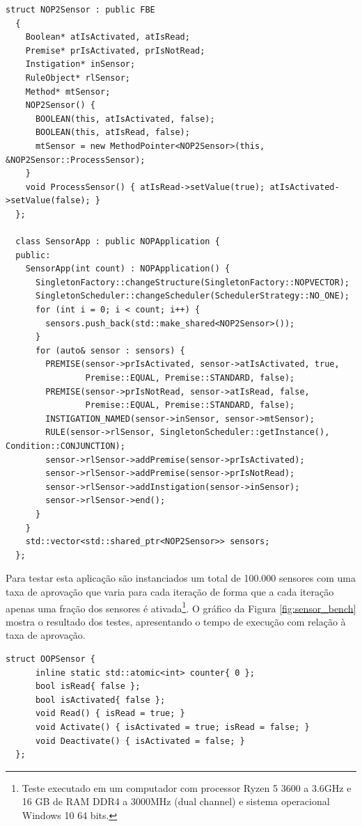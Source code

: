 \begin{lstlisting}[caption = {Código da estrutura do sensor com o \textit{Framework} PON C++ 2.0},
  source = {Autoria própria},
  label = {cod:sensor_fw2}]
  struct NOP2Sensor : public FBE
  {
    Boolean* atIsActivated, atIsRead;
    Premise* prIsActivated, prIsNotRead;
    Instigation* inSensor;
    RuleObject* rlSensor;  
    Method* mtSensor;  
    NOP2Sensor() {
      BOOLEAN(this, atIsActivated, false);
      BOOLEAN(this, atIsRead, false);
      mtSensor = new MethodPointer<NOP2Sensor>(this, &NOP2Sensor::ProcessSensor);
    }
    void ProcessSensor() { atIsRead->setValue(true); atIsActivated->setValue(false); }
  };

  class SensorApp : public NOPApplication {
  public:
    SensorApp(int count) : NOPApplication() {
      SingletonFactory::changeStructure(SingletonFactory::NOPVECTOR);
      SingletonScheduler::changeScheduler(SchedulerStrategy::NO_ONE);
      for (int i = 0; i < count; i++) {
        sensors.push_back(std::make_shared<NOP2Sensor>());
      }
      for (auto& sensor : sensors) {
        PREMISE(sensor->prIsActivated, sensor->atIsActivated, true,
                Premise::EQUAL, Premise::STANDARD, false);
        PREMISE(sensor->prIsNotRead, sensor->atIsRead, false,
                Premise::EQUAL, Premise::STANDARD, false);
        INSTIGATION_NAMED(sensor->inSensor, sensor->mtSensor);
        RULE(sensor->rlSensor, SingletonScheduler::getInstance(), Condition::CONJUNCTION);
        sensor->rlSensor->addPremise(sensor->prIsActivated);
        sensor->rlSensor->addPremise(sensor->prIsNotRead);
        sensor->rlSensor->addInstigation(sensor->inSensor);
        sensor->rlSensor->end();
      }
    }
    std::vector<std::shared_ptr<NOP2Sensor>> sensors;
  };
\end{lstlisting}

Para testar esta aplicação são instanciados um total de 100.000 sensores com uma
taxa de aprovação que varia para cada iteração de forma que a cada iteração
apenas uma fração dos sensores é ativada\footnote{Teste executado em um
computador com processor Ryzen 5 3600 a 3.6GHz e 16 GB de RAM DDR4 a 3000MHz
(dual channel) e sistema operacional Windows 10 64 bits.}. O gráfico da Figura
\ref{fig:sensor_bench} mostra o resultado dos testes, apresentando o tempo de
execução com relação à taxa de aprovação.

\begin{lstlisting}[caption = {Código da estrutura do sensor em POO},
  source = {Autoria própria},
  label = {cod:sensor_oop}]
  struct OOPSensor {
      inline static std::atomic<int> counter{ 0 };
      bool isRead{ false };
      bool isActivated{ false };
      void Read() { isRead = true; }
      void Activate() { isActivated = true; isRead = false; }
      void Deactivate() { isActivated = false; }
  };
\end{lstlisting}


